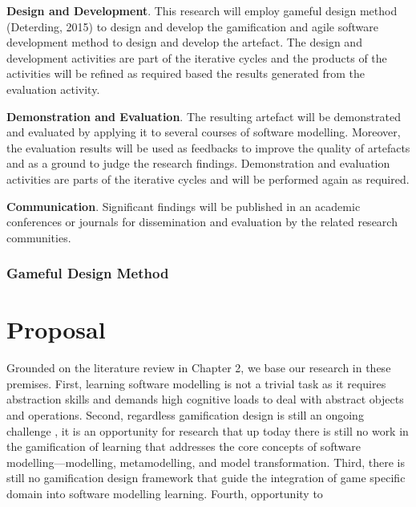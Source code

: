 \documentclass[a4paper]{Report}
\begin{document}
\textbf{Design and Development}. This research will employ gameful design method (Deterding, 2015) to design and develop the gamification and agile software development method to design and develop the artefact. The design and development activities are part of the iterative cycles and the products of the activities will be refined as required based the results generated from the evaluation activity.

\textbf{Demonstration and Evaluation}. The resulting artefact will be demonstrated and evaluated by applying it to several courses of software modelling. Moreover, the evaluation results will be used as feedbacks to improve the quality of artefacts and as a ground to judge the research findings.  Demonstration and evaluation activities are parts of the iterative cycles and will be performed again as required. 

\textbf{Communication}. Significant findings will be published in an academic conferences or journals for dissemination and evaluation by the related research communities.


 
\subsection{Gameful Design Method}




\chapter{Proposal}
Grounded on the literature review in Chapter 2, we base our research in these premises. First, learning software modelling is not a trivial task as it requires abstraction skills and demands high cognitive loads to deal with abstract objects and operations. Second, regardless gamification design is still an ongoing challenge \cite{Deterding2013}, it is an opportunity for research that up today there is still no work in the gamification of learning that addresses the core concepts of software modelling—modelling, metamodelling, and model transformation. Third, there is still no gamification design framework that guide the integration of game specific domain into software modelling learning. Fourth, opportunity to 
\end{document}
